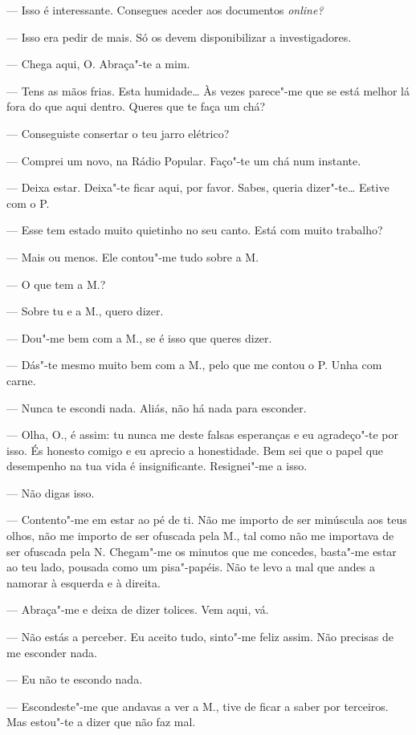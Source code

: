 --- Isso é interessante. Consegues aceder aos documentos
\emph{online?}

--- Isso era pedir de mais. Só os devem disponibilizar a investigadores.

--- Chega aqui, O. Abraça"-te a mim.

--- Tens as mãos frias. Esta humidade\ldots{} Às vezes parece"-me que se está
melhor lá fora do que aqui dentro. Queres que te faça um
chá?

--- Conseguiste consertar o teu jarro elétrico?

--- Comprei um novo, na Rádio Popular. Faço"-te um chá num instante.

--- Deixa estar. Deixa"-te ficar aqui, por favor. Sabes, queria
  dizer"-te\ldots{} Estive com o P.

--- Esse tem estado muito quietinho no seu canto. Está com muito trabalho?

--- Mais ou menos. Ele contou"-me tudo sobre a M.

--- O que tem a M.?

--- Sobre tu e a M., quero dizer.

--- Dou"-me bem com a M., se é isso que queres dizer.

--- Dás"-te mesmo muito bem com a M., pelo que me contou o P. Unha com
  carne.

--- Nunca te escondi nada. Aliás, não há nada para esconder.

--- Olha, O., é assim: tu nunca me deste falsas esperanças e eu
  agradeço"-te por isso. És honesto comigo e eu aprecio a honestidade.
  Bem sei que o papel que desempenho na tua vida é insignificante.
  Resignei"-me a isso.

--- Não digas isso.

--- Contento"-me em estar ao pé de ti. Não me importo de
ser minúscula aos teus olhos, não me importo de ser ofuscada pela M.,
tal como não me importava de ser ofuscada pela N. Chegam"-me os minutos
que me concedes, basta"-me estar ao teu lado, pousada como um
pisa"-papéis. Não te levo a mal que andes a namorar à esquerda e à
direita.

--- Abraça"-me e deixa de dizer tolices. Vem aqui, vá.

--- Não estás a perceber. Eu aceito tudo, sinto"-me feliz assim. Não
  precisas de me esconder nada.

--- Eu não te escondo nada.

--- Escondeste"-me que andavas a ver a M., tive de ficar a saber por
  terceiros. Mas estou"-te a dizer que não faz mal.

